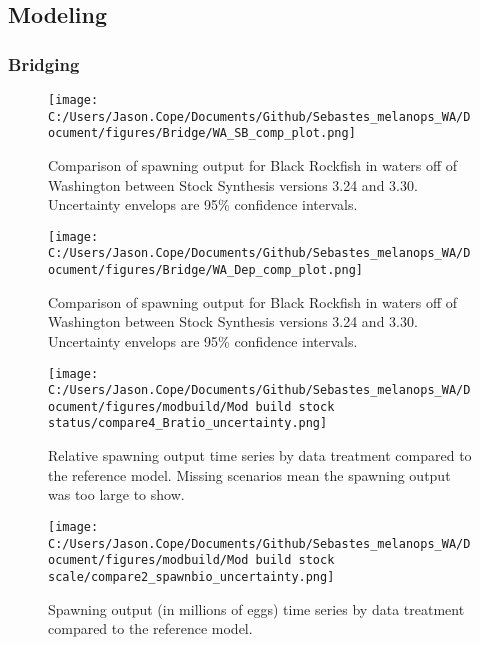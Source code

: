 \documentclass[11pt,
  english,
  letterpaper,
]{article}
\begin{document}
\clearpage

\hypertarget{modeling}{%
\subsection{Modeling}\label{modeling}}

\hypertarget{bridging}{%
\subsubsection{Bridging}\label{bridging}}

\begin{figure}
\centering
\texttt{[image: C:/Users/Jason.Cope/Documents/Github/Sebastes\_melanops\_WA/Document/figures/Bridge/WA\_SB\_comp\_plot.png]}
\caption{Comparison of spawning output for Black Rockfish in waters off of Washington between Stock Synthesis versions 3.24 and 3.30. Uncertainty envelops are 95\% confidence intervals.\label{fig:ssb_bridge_comps}}
\end{figure}

\pagebreak

\begin{figure}
\centering
\texttt{[image: C:/Users/Jason.Cope/Documents/Github/Sebastes\_melanops\_WA/Document/figures/Bridge/WA\_Dep\_comp\_plot.png]}
\caption{Comparison of spawning output for Black Rockfish in waters off of Washington between Stock Synthesis versions 3.24 and 3.30. Uncertainty envelops are 95\% confidence intervals.\label{fig:deps_bridge_comps}}
\end{figure}

\pagebreak

\begin{figure}
\centering
\texttt{[image: C:/Users/Jason.Cope/Documents/Github/Sebastes\_melanops\_WA/Document/figures/modbuild/Mod build stock status/compare4\_Bratio\_uncertainty.png]}
\caption{Relative spawning output time series by data treatment compared to the reference model. Missing scenarios mean the spawning output was too large to show.\label{fig:modbuild-data-depl}}
\end{figure}

\begin{figure}
\centering
\texttt{[image: C:/Users/Jason.Cope/Documents/Github/Sebastes\_melanops\_WA/Document/figures/modbuild/Mod build stock scale/compare2\_spawnbio\_uncertainty.png]}
\caption{Spawning output (in millions of eggs) time series by data treatment compared to the reference model.\label{fig:modbuild-data-ssb}}
\end{figure}
\end{document}
